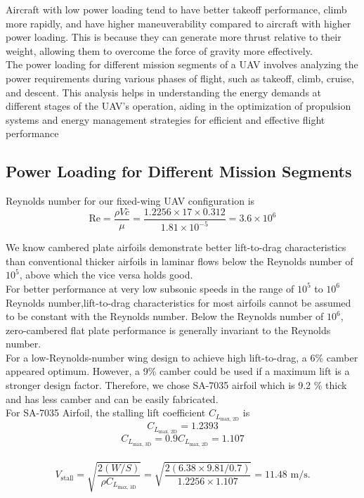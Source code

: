 \documentclass[12 pt]{article}
\begin{document}
Aircraft with low power loading tend to have better takeoff performance, climb more rapidly, and have higher maneuverability compared to aircraft with higher power loading. This is because they can generate more thrust relative to their weight, allowing them to overcome the force of gravity more effectively.\\

The power loading for different mission segments of a UAV involves analyzing the power requirements during various phases of flight, such as takeoff, climb, cruise, and descent. This analysis helps in understanding the energy demands at different stages of the UAV's operation, aiding in the optimization of propulsion systems and energy management strategies for efficient and effective flight performance

\subsection{{Power Loading for Different Mission Segments}}


Reynolds number for our fixed-wing UAV configuration is\begin{equation} 
\text{Re} = \frac{\rho V \bar{c}}{\mu} = \frac{1.2256 \times 17 \times 0.312}{1.81 \times 10^{-5}} = 3.6 \times 10^6 
\tag{3.10}
\end{equation}

We know cambered plate airfoils demonstrate better lift-to-drag characteristics than conventional thicker airfoils in laminar flows below the Reynolds number of ${10^5}$, above which the vice versa holds good.\\

For better performance at very low subsonic speeds in the range of ${10^5}$ to ${10^6}$ Reynolds number,lift-to-drag characteristics for most airfoils cannot be assumed to be constant with the Reynolds number. Below the Reynolds number of ${10^6}$, zero-cambered flat plate performance is generally invariant to the Reynolds number. \\

For a low-Reynolds-number wing design to achieve high lift-to-drag, a 6\% camber appeared optimum. However, a 9\% camber could be used if a maximum lift is a stronger design factor. Therefore, we chose SA-7035 airfoil which is 9.2 \% thick and has less camber and can be easily fabricated.\\

For SA-7035 Airfoil, the stalling lift coefficient $C_{L_{\text{max, 2D}}}$ is 
$$C_{L_{\text{max, 2D}}} = 1.2393 $$
$$C_{L_{\text{max, 3D}}} = 0.9 C_{L_{\text{max, 2D}}} = 1.107$$\\
\begin{equation} 
V_{\text{stall}} = \sqrt{\frac{2(W/S)}{\rho C_{L_{\text{max, 3D}}}}} = \sqrt{\frac{2(6.38 \times 9.81 / 0.7)}{1.2256 \times 1.107}} = 11.48 \text{ m/s}. 
\tag{3.11}
\end{equation}
\\ 
\end{document}
